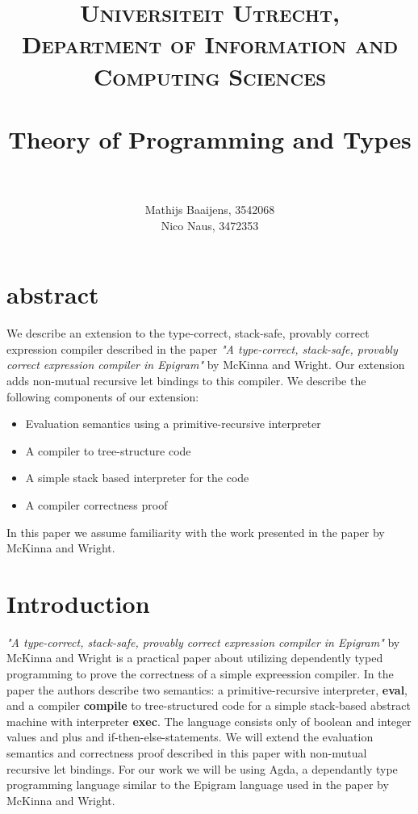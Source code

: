 \documentclass[paper=a4, fontsize=11pt]{scrartcl} %
\title{ 
\normalfont \normalsize 
\textsc{Universiteit Utrecht, Department of Information and Computing Sciences} \\ [25pt] %
\horrule{0.5pt} \\[0.4cm] %
\huge Theory of Programming and Types\\ %
\horrule{2pt} \\[0.5cm] %
}
\author{Mathijs Baaijens, 3542068 \\ Nico Naus, 3472353} %
\numberwithin{equation}{section} %
\numberwithin{figure}{section} %
\numberwithin{table}{section} %
\begin{document}
\maketitle %


\section{abstract}
We describe an extension to the type-correct, stack-safe, provably correct expression compiler described in the paper \textit{"A type-correct, stack-safe, provably correct expression compiler in Epigram"} by McKinna and Wright. Our extension adds non-mutual recursive \ttfamily let \normalfont  bindings to this compiler. We describe the following components of our extension:
\begin{itemize}
\item{Evaluation semantics using a primitive-recursive interpreter}
\item{A compiler to tree-structure code}
\item{A simple stack based interpreter for the code}
\item{A compiler correctness proof}
\end{itemize}
In this paper we assume familiarity with the work presented in the paper by McKinna and Wright.

\section{Introduction}
\textit{"A type-correct, stack-safe, provably correct expression compiler in Epigram"}\cite{Compiler} by McKinna and Wright is a practical paper about utilizing dependently typed programming to prove the correctness of a simple expreession compiler. In the paper the authors describe two semantics: a primitive-recursive interpreter, \textbf{eval}, and a compiler \textbf{compile} to tree-structured code for a simple stack-based abstract machine with interpreter \textbf{exec}. The language consists only of boolean and integer values and plus and if-then-else-statements. We will extend the evaluation semantics and correctness proof described in this paper with non-mutual recursive \ttfamily let \normalfont  bindings. For our work we will be using Agda\cite{Agda}, a dependantly type programming language similar to the Epigram language used in the paper by McKinna and Wright. 
\end{document}
